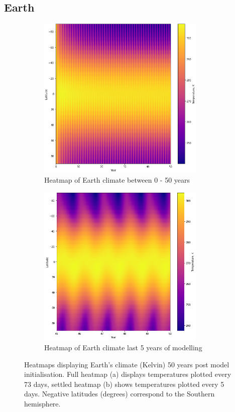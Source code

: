 \documentclass[12pt,onecolumn]{revtex4-2}    %
\begin{document}
\subsection{Earth}

\begin{figure}
\begin{subfigure}{.5\textwidth}
  \centering
  \includegraphics[width = 8cm]{Earth50yrsHeatmap.png}
  \caption{Heatmap of Earth climate between 0 - 50 years}
  \label{fig:sub1}
\end{subfigure}%
\begin{subfigure}{.5\textwidth}
  \centering
  \includegraphics[width=8cm]{Earth5yrsHeatmap.png}
  \caption{Heatmap of Earth climate last 5 years of modelling}
  \label{fig:sub2}
\end{subfigure}
\raggedright
\caption{Heatmaps displaying Earth's climate (Kelvin) 50 years post model initialisation. Full heatmap (a) displays temperatures plotted every 73 days, settled heatmap (b) shows temperatures plotted every 5 days. Negative latitudes (degrees) correspond to the Southern hemisphere.}
\label{fig:test}
\end{figure}
\end{document}
